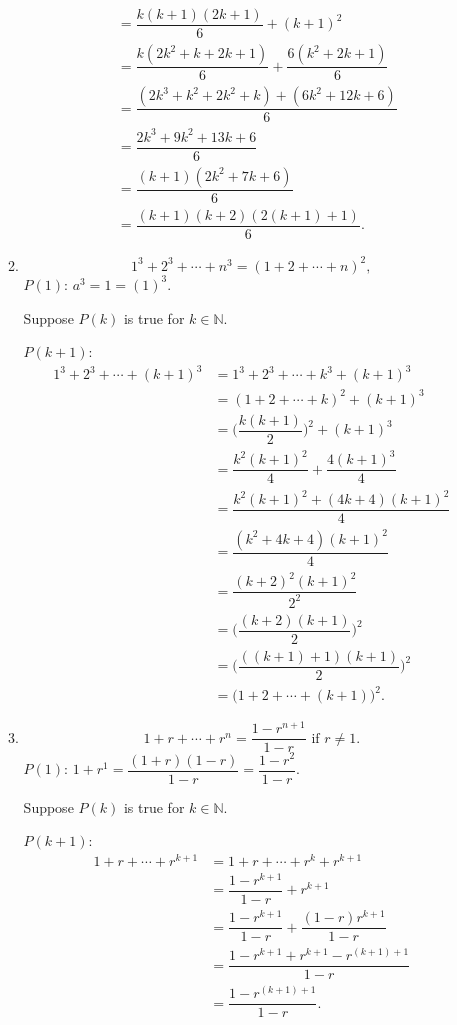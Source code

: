 \begin{enumerate}
\begin{enumerate}[label=(\roman*),align=left]
\begin{align*}
			&= \dfrac{k(k+1)(2k+1)}{6} + (k+1)^2\\
			& = \dfrac{k(2k^2+k+2k+1)}{6} + \dfrac{6(k^2+2k+1)}{6} \\
			& = \dfrac{(2k^3+k^2+2k^2+k)+(6k^2+12k+6)}{6} \\
			&= \dfrac{2k^3+9k^2+13k+6}{6} \\
			&= \dfrac{(k+1)(2k^2+7k+6)}{6} \\
			&= \dfrac{(k+1)(k+2)(2(k+1)+1)}{6}.
		\end{align*}
        \item \[ 1^3 + 2^3 + \cdots + n^3 = (1+2+\cdots +n)^2, \]
        $P(1)$: $a^3 = 1 = (1)^3$.\par
		Suppose $P(k)$ is true for $k \in \mathbb{N}$.\par
		$P(k+1)$: 
		\begin{align*}
			1^3 + 2^3 + \cdots + (k+1)^3 &= 1^3 + 2^3 + \cdots + k^3 + (k+1)^3 \\
			&= (1+2+\cdots +k)^2 + (k+1)^3 \\
			&= \biggl (\dfrac{k(k+1)}{2} \biggr)^2 + (k+1)^3 \\
			&= \dfrac{k^2(k+1)^2}{4} + \dfrac{4(k+1)^3}{4} \\
			&= \dfrac{k^2(k+1)^2+(4k+4)(k+1)^2}{4} \\
			&= \dfrac{(k^2+4k+4)(k+1)^2}{4} \\
			&= \dfrac{(k+2)^2(k+1)^2}{2^2} \\
			&= \biggl (\dfrac{(k+2)(k+1)}{2} \biggr )^2 \\
			&= \biggl (\dfrac{((k+1)+1)(k+1)}{2} \biggr )^2 \\
			&= \biggl (1+2+ \cdots + (k+1) \biggr )^2.
		\end{align*}
        \item \[ 1+r+\cdots +r^n = \dfrac{1-r^{n+1}}{1-r} \text{ if } r \neq 1.\]
        $P(1)$: $1+r^1 = \dfrac{(1+r)(1-r)}{1-r} = \dfrac{1-r^2}{1-r}$.\par
		Suppose $P(k)$ is true for $k \in \mathbb{N}$.\par
		$P(k+1)$: 
		\begin{align*}
			1+r+\cdots +r^{k+1} &= 1+r+\cdots + r^k +r^{k+1} \\
			&= \dfrac{1-r^{k+1}}{1-r} +r^{k+1} \\
			&= \dfrac{1-r^{k+1}}{1-r} +\dfrac{(1-r)r^{k+1}}{1-r} \\
			&= \dfrac{1-r^{k+1} + r^{k+1} - r^{(k+1)+1} }{1-r} \\
			&= \dfrac{1 - r^{(k+1)+1} }{1-r}.
		\end{align*}
    \end{enumerate}
\end{enumerate}


